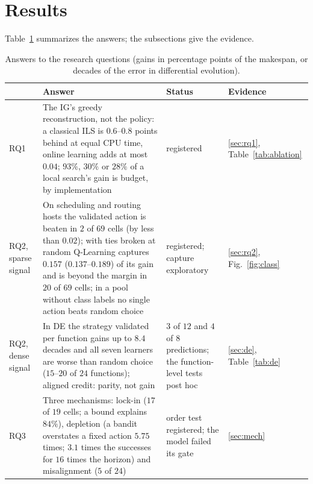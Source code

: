 \documentclass[conference,a4paper]{IEEEtran}
\begin{document}


\section{Results}
Table~\ref{tab:answers} summarizes the answers; the subsections give the evidence.

\begin{table}[t]
\caption{Answers to the research questions (gains in percentage points of the makespan, or decades of the error in differential evolution).}
\label{tab:answers}
\centering
{\scriptsize\setlength{\tabcolsep}{3pt}
\begin{tabular}{@{}lp{10.3cm}p{3.1cm}l@{}}
\toprule
 & Answer & Status & Evidence \\
\midrule
RQ1 & The IG's greedy reconstruction, not the policy: a classical ILS is $0.6$--$0.8$ points behind at equal CPU time, online learning adds at most $0.04$; $93\%$, $30\%$ or $28\%$ of a local search's gain is budget, by implementation & registered & \ref{sec:rq1}, Table~\ref{tab:ablation} \\
RQ2, sparse signal & On scheduling and routing hosts the validated action is beaten in $2$ of $69$ cells (by less than $0.02$); with ties broken at random Q-Learning captures $0.157$ ($0.137$--$0.189$) of its gain and is beyond the margin in $20$ of $69$ cells; in a pool without class labels no single action beats random choice & registered; capture exploratory & \ref{sec:rq2}, Fig.~\ref{fig:class} \\
RQ2, dense signal & In DE the strategy validated per function gains up to $8.4$ decades and all seven learners are worse than random choice ($15$--$20$ of $24$ functions); aligned credit: parity, not gain & $3$ of $12$ and $4$ of $8$ predictions; the function-level tests post hoc & \ref{sec:de}, Table~\ref{tab:de} \\
RQ3 & Three mechanisms: lock-in ($17$ of $19$ cells; a bound explains $84\%$), depletion (a bandit overstates a fixed action $5.75$ times; $3.1$ times the successes for $16$ times the horizon) and misalignment ($5$ of $24$) & order test registered; the model failed its gate & \ref{sec:mech} \\
\bottomrule
\end{tabular}}
\end{table}
\end{document}
